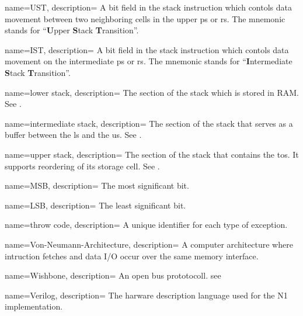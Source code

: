  {
    name={UST},
    description={
      A bit field in the stack instruction which contols data movement
      between two neighboring \glspl{cell} in the upper \gls{ps} or \gls{rs}.
      The mnemonic stands for ``\textbf{U}pper \textbf{S}tack \textbf{T}ransition''.
      \nopostdesc
    }
}

 {
    name={IST},
    description={
      A bit field in the stack instruction which contols data movement
      on the intermediate \gls{ps} or \gls{rs}.
      The mnemonic stands for
      ``\textbf{I}ntermediate \textbf{S}tack \textbf{T}ransition''.
      \nopostdesc
    }
}

 {
    name={lower stack},
    description={
      The section of the stack which is stored in RAM.
      See . 
      \nopostdesc
    }
}

 {
    name={intermediate stack},
    description={
      The section of the stack that serves as a buffer between the
      \gls{ls} and the \gls{us}.
      See . 
      \nopostdesc
    }
}

 {
    name={upper stack},
    description={
      The section of the stack that contains the \gls{tos}. It supports
      reordering of its storage \gls{cell}.
      See . 
      \nopostdesc
    }
}

 {
    name={MSB},
    description={
      The most significant bit.
      \nopostdesc
    }
}

 {
    name={LSB},
    description={
      The least significant bit.
      \nopostdesc
    }
}

 {
    name={throw code},
    description={
      A unique identifier for each type of exception.
      \nopostdesc
    }
}

 {
    name={Von-Neumann-Architecture},
    description={
      A computer architecture where intruction fetches and data I/O occur
      over the same memory interface.
      \nopostdesc
    }
}

 {
    name={Wishbone},
    description={
      An open bus prototocoll. see \cite{wishbone}
      \nopostdesc
    }
}

 {
    name={Verilog},
    description={
      The harware description language used for the N1 implementation.
      \nopostdesc
    }
}

